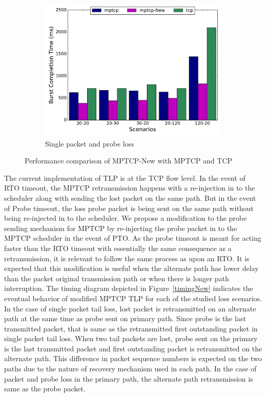 \documentclass[10pt,conference]{IEEEtran}
\begin{document}
\begin{figure}
\begin{subfigure}[b]{0.32\textwidth}
\includegraphics[angle=0, width=\textwidth, natwidth=578.16,natheight=433.62]{plots/1PPNew.pdf}
\caption{Single packet and probe loss}\label{1ppn}
\end{subfigure}
\caption{Performance comparison of MPTCP-New with MPTCP and TCP}\label{mpnew}
\end{figure}

The current implementation of TLP is at the TCP flow level. In the event of RTO timeout, the MPTCP retransmission happens with a re-injection in 
to the scheduler along with sending the lost packet on the same path. But in the event of Probe timeout, the loss probe packet is being sent on 
the same path without being re-injected in to the scheduler. We propose a modification to the probe sending mechanism for MPTCP by re-injecting 
the probe packet in to the MPTCP scheduler in the event of PTO. As the probe timeout is meant for acting faster than the RTO timeout with 
essentially the same consequence as a retransmission, it is relevant to follow the same process as upon an RTO. It is expected that this 
modification is useful when the alternate path has lower delay than the packet original transmission path or when there is longer path 
interruption. The timing diagram depicted in Figure~\ref{timingNew} indicates the eventual behavior of modified MPTCP TLP for each of the studied 
loss scenarios. In the case of single packet tail loss, lost packet is retransmitted on an alternate path at the same time as probe sent on primary
path. Since probe is the last transmitted packet, that is same as the retransmitted first outstanding packet in single packet tail loss. When two tail packets are lost,
probe sent on the primary is the last transmitted packet and first outstanding packet is retransmitted on the alternate path. This difference in packet
sequence numbers is expected on the two paths due to the nature of recovery mechanism used in each path. In the case of packet and probe loss in the 
primary path, the alternate path retransmission is same as the probe packet.
\end{document}
